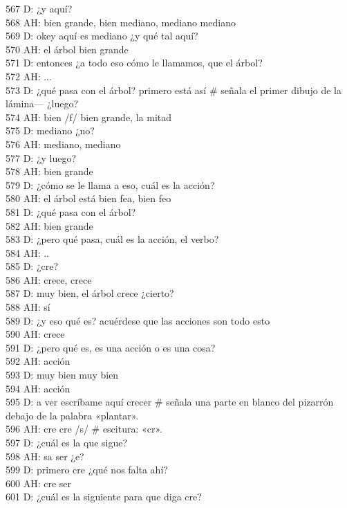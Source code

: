 567 D: ¿y aquí?\\
568 AH: bien grande, bien mediano, mediano mediano\\
569 D: okey aquí es mediano ¿y qué tal aquí?\\
570 AH: el árbol bien grande\\
571 D: entonces ¿a todo eso cómo le llamamos, que el árbol?\\
572 AH: ...\\
573 D: ¿qué pasa con el árbol? primero está así \# señala el primer dibujo de la lámina--- ¿luego?\\
574 AH: bien /f/ bien grande, la mitad\\
575 D: mediano ¿no?\\
576 AH: mediano, mediano\\
577 D: ¿y luego?\\
578 AH: bien grande\\
579 D: ¿cómo se le llama a eso, cuál es la acción?\\
580 AH: el árbol está bien fea, bien feo\\
581 D: ¿qué pasa con el árbol?\\
582 AH: bien grande\\
583 D: ¿pero qué pasa, cuál es la acción, el verbo?\\
584 AH: ..\\
585 D: ¿cre?\\
586 AH: crece, crece\\
587 D: muy bien, el árbol crece ¿cierto?\\
588 AH: sí\\
589 D: ¿y eso qué es? acuérdese que las acciones son todo esto\\
590 AH: crece\\
591 D: ¿pero qué es, es una acción o es una cosa?\\
592 AH: acción\\
593 D: muy bien muy bien\\
594 AH: acción\\
595 D: a ver escríbame aquí crecer \# señala una parte en blanco del pizarrón debajo de la palabra «plantar».\\
596 AH: cre cre /s/ \# escitura: «cr».\\
597 D: ¿cuál es la que sigue?\\
598 AH: sa ser ¿e?\\
599 D: primero cre ¿qué nos falta ahí?\\
600 AH: cre ser\\
601 D: ¿cuál es la siguiente para que diga cre?\\
